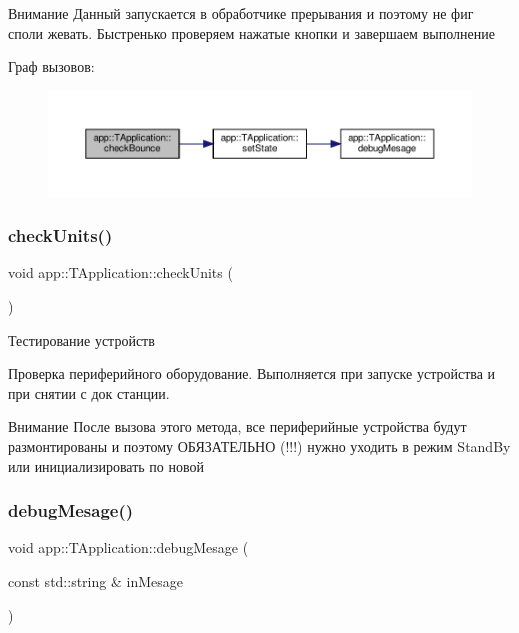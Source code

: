 \begin{DoxyAttention}{Внимание}
Данный запускается в обработчике прерывания и поэтому не фиг споли жевать. Быстренько проверяем нажатые кнопки и завершаем выполнение 
\end{DoxyAttention}
Граф вызовов\+:\nopagebreak
\begin{figure}[H]
\begin{center}
\leavevmode
\includegraphics[width=350pt]{classapp_1_1_t_application_a4c4d1d33ea8ab73ba49a59528d200501_cgraph}
\end{center}
\end{figure}
\mbox{\label{classapp_1_1_t_application_acf71a4fe338cbc1e771cc9a60431c3bf}} 
\subsubsection{\texorpdfstring{check\+Units()}{checkUnits()}}
{\footnotesize\ttfamily void app\+::\+T\+Application\+::check\+Units (\begin{DoxyParamCaption}{ }\end{DoxyParamCaption})}



Тестирование устройств 

Проверка периферийного оборудование. Выполняется при запуске устройства и при снятии с док станции. \begin{DoxyAttention}{Внимание}
После вызова этого метода, все периферийные устройства будут размонтированы и поэтому ОБЯЗАТЕЛЬНО (!!!) нужно уходить в режим Stand\+By или инициализировать по новой 
\end{DoxyAttention}
\mbox{\label{classapp_1_1_t_application_a2ac87a63360e7974afe2249f7b7e54cd}} 
\subsubsection{\texorpdfstring{debug\+Mesage()}{debugMesage()}\hspace{0.1cm}{\footnotesize\ttfamily [1/4]}}
{\footnotesize\ttfamily void app\+::\+T\+Application\+::debug\+Mesage (\begin{DoxyParamCaption}\item[{const std\+::string \&}]{in\+Mesage }\end{DoxyParamCaption})}



